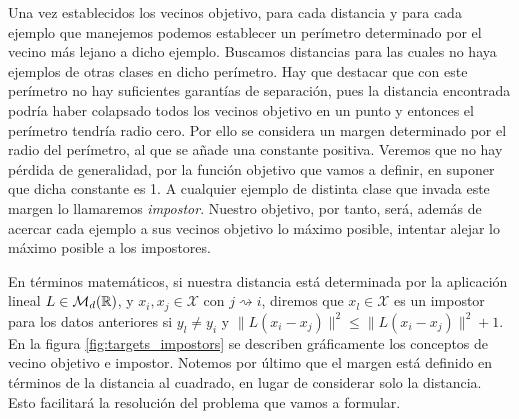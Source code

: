 \documentclass{book}
\newcommand{\istargetof}{\rightsquigarrow}
\begin{document}
Una vez establecidos los vecinos objetivo, para cada distancia y para cada ejemplo que manejemos podemos establecer un perímetro determinado por el vecino más lejano a dicho ejemplo. Buscamos distancias para las cuales no haya ejemplos de otras clases en dicho perímetro. Hay que destacar que con este perímetro no hay suficientes garantías de separación, pues la distancia encontrada podría haber colapsado todos los vecinos objetivo en un punto y entonces el perímetro tendría radio cero. Por ello se considera un margen determinado por el radio del perímetro, al que se añade una constante positiva. Veremos que no hay pérdida de generalidad, por la función objetivo que vamos a definir, en suponer que dicha constante es 1. A cualquier ejemplo de distinta clase que invada este margen lo llamaremos \emph{impostor}. Nuestro objetivo, por tanto, será, además de acercar cada ejemplo a sus vecinos objetivo lo máximo posible, intentar alejar lo máximo posible a los impostores.

En términos matemáticos, si nuestra distancia está determinada por la aplicación lineal $L \in \mathcal{M}_{d}(\mathbb{R})$, y $x_i, x_j \in \mathcal{X}$ con $j \istargetof i$, diremos que $x_l \in \mathcal{X}$ es un impostor para los datos anteriores si $y_l \ne y_i$ y $\|L(x_i - x_j)\|^2 \le \|L(x_i - x_j)\|^2+1$. En la figura \ref{fig:targets_impostors} se describen gráficamente los conceptos de vecino objetivo e impostor. Notemos por último que el margen está definido en términos de la distancia al cuadrado, en lugar de considerar solo la distancia. Esto facilitará la resolución del problema que vamos a formular.
\end{document}
